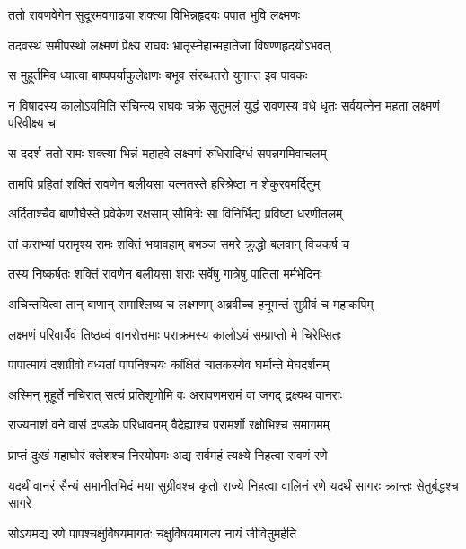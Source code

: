 \twolineshloka
{ततो रावणवेगेन सुदूरमवगाढया}
{शक्त्या विभिन्नहृदयः पपात भुवि लक्ष्मणः} %

\twolineshloka
{तदवस्थं समीपस्थो लक्ष्मणं प्रेक्ष्य राघवः}
{भ्रातृस्नेहान्महातेजा विषण्णहृदयोऽभवत्} %

\twolineshloka
{स मुहूर्तमिव ध्यात्वा बाष्पपर्याकुलेक्षणः}
{बभूव संरब्धतरो युगान्त इव पावकः} %

\threelineshloka
{न विषादस्य कालोऽयमिति संचिन्त्य राघवः}
{चक्रे सुतुमलं युद्धं रावणस्य वधे धृतः}
{सर्वयत्नेन महता लक्ष्मणं परिवीक्ष्य च} %

\twolineshloka
{स ददर्श ततो रामः शक्त्या भिन्नं महाहवे}
{लक्ष्मणं रुधिरादिग्धं सपन्नगमिवाचलम्} %

\twolineshloka
{तामपि प्रहितां शक्तिं रावणेन बलीयसा}
{यत्नतस्ते हरिश्रेष्ठा न शेकुरवमर्दितुम्} %

\twolineshloka
{अर्दिताश्चैव बाणौघैस्ते प्रवेकेण रक्षसाम्}
{सौमित्रेः सा विनिर्भिद्य प्रविष्टा धरणीतलम्} %

\twolineshloka
{तां कराभ्यां परामृश्य रामः शक्तिं भयावहाम्}
{बभञ्ज समरे क्रुद्धो बलवान् विचकर्ष च} %

\twolineshloka
{तस्य निष्कर्षतः शक्तिं रावणेन बलीयसा}
{शराः सर्वेषु गात्रेषु पातिता मर्मभेदिनः} %

\twolineshloka
{अचिन्तयित्वा तान् बाणान् समाश्लिष्य च लक्ष्मणम्}
{अब्रवीच्च हनूमन्तं सुग्रीवं च महाकपिम्} %

\twolineshloka
{लक्ष्मणं परिवार्यैवं तिष्ठध्वं वानरोत्तमाः}
{पराक्रमस्य कालोऽयं सम्प्राप्तो मे चिरेप्सितः} %

\twolineshloka
{पापात्मायं दशग्रीवो वध्यतां पापनिश्चयः}
{कांक्षितं चातकस्येव घर्मान्ते मेघदर्शनम्} %

\twolineshloka
{अस्मिन् मुहूर्ते नचिरात् सत्यं प्रतिशृणोमि वः}
{अरावणमरामं वा जगद् द्रक्ष्यथ वानराः} %

\twolineshloka
{राज्यनाशं वने वासं दण्डके परिधावनम्}
{वैदेह्याश्च परामर्शो रक्षोभिश्च समागमम्} %

\twolineshloka
{प्राप्तं दुःखं महाघोरं क्लेशश्च निरयोपमः}
{अद्य सर्वमहं त्यक्ष्ये निहत्वा रावणं रणे} %

\threelineshloka
{यदर्थं वानरं सैन्यं समानीतमिदं मया}
{सुग्रीवश्च कृतो राज्ये निहत्वा वालिनं रणे}
{यदर्थं सागरः क्रान्तः सेतुर्बद्धश्च सागरे} %

\twolineshloka
{सोऽयमद्य रणे पापश्चक्षुर्विषयमागतः}
{चक्षुर्विषयमागत्य नायं जीवितुमर्हति} %

